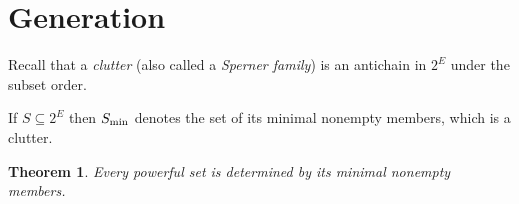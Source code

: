 \documentclass[12pt]{article}
\newtheorem{thm}{Theorem}[section]
\begin{document}

\section{Generation}
\label{sec:generation}

Recall that a \textit{clutter} (also called a \textit{Sperner family}) is
an antichain in $2^E$ under the subset order.

If $S\subseteq2^E$ then $S_{\scriptsize\hbox{min}}$ denotes the set of
its minimal nonempty members, which is a clutter.

\begin{thm}
Every powerful set is determined by its minimal nonempty members.
\end{thm}
\end{document}
